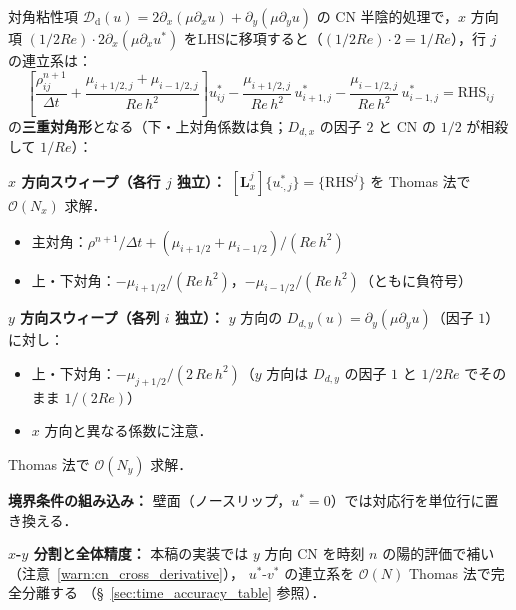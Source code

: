 \begin{tcolorbox}[algbox, title={CN 対角粘性系の行列構造と Thomas 法による求解}]
\label{box:cn_tridiagonal}
対角粘性項 $\mathcal{D}_{\mathrm{d}}(u) = 2\partial_x(\mu\partial_x u) + \partial_y(\mu\partial_y u)$
の CN 半陰的処理で，$x$ 方向項 $(1/2Re)\cdot 2\partial_x(\mu\partial_x u^*)$
をLHSに移項すると（$(1/2Re)\cdot 2 = 1/Re$），行 $j$ の連立系は：
\[
  \left[\frac{\rho^{n+1}_{ij}}{\Delta t}
    + \frac{\mu_{i+1/2,j}+\mu_{i-1/2,j}}{Re\,h^2}\right]u^*_{ij}
  - \frac{\mu_{i+1/2,j}}{Re\,h^2}\,u^*_{i+1,j}
  - \frac{\mu_{i-1/2,j}}{Re\,h^2}\,u^*_{i-1,j}
  = \mathrm{RHS}_{ij}
\]
の\textbf{三重対角形}となる（下・上対角係数は負；$D_{d,x}$ の因子 $2$ と CN の $1/2$ が相殺して $1/Re$）：

\medskip
\textbf{$x$ 方向スウィープ（各行 $j$ 独立）：}
$[\mathbf{L}_x^j]\{u^*_{\cdot,j}\} = \{\mathrm{RHS}^j\}$ を Thomas 法で $\mathcal{O}(N_x)$ 求解．
\begin{itemize}
  \item 主対角：$\rho^{n+1}/\Delta t + (\mu_{i+1/2}+\mu_{i-1/2})/(Re\,h^2)$
  \item 上・下対角：$-\mu_{i+1/2}/(Re\,h^2)$，$-\mu_{i-1/2}/(Re\,h^2)$（ともに負符号）
\end{itemize}

\textbf{$y$ 方向スウィープ（各列 $i$ 独立）：}
$y$ 方向の $D_{d,y}(u) = \partial_y(\mu\partial_y u)$（因子 $1$）に対し：
\begin{itemize}
  \item 上・下対角：$-\mu_{j+1/2}/(2\,Re\,h^2)$（$y$ 方向は $D_{d,y}$ の因子 $1$ と $1/2Re$ でそのまま $1/(2Re)$）
  \item $x$ 方向と異なる係数に注意．
\end{itemize}
Thomas 法で $\mathcal{O}(N_y)$ 求解．

\textbf{境界条件の組み込み：}
壁面（ノースリップ，$u^*=0$）では対応行を単位行に置き換える．

\textbf{$x$-$y$ 分割と全体精度：}
本稿の実装では $y$ 方向 CN を時刻 $n$ の陽的評価で補い（注意~\ref{warn:cn_cross_derivative}），
$u^*$-$v^*$ の連立系を $\mathcal{O}(N)$ Thomas 法で完全分離する
（§~\ref{sec:time_accuracy_table} 参照）．
\end{tcolorbox}
